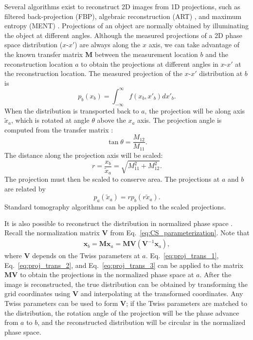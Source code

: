 Several algorithms exist to reconstruct 2D images from 1D projections, such as filtered back-projection (FBP), algebraic reconstruction (ART) \cite{Slaney1988}, and maximum entropy (MENT) \cite{Minerbo1979}. Projections of an object are normally obtained by illuminating the object at different angles. Although the measured projections of a 2D phase space distribution ($x$-$x'$) are always along the $x$ axis, we can take advantage of the known transfer matrix $\mathbf{M}$ between the measurement location $b$ and the reconstruction location $a$ to obtain the projections at different angles in $x$-$x'$ at the reconstruction location. The measured projection of the $x$-$x'$ distribution at $b$ is
%
\begin{equation}
    p_b(x_b) = \int_{-\infty}^{\infty} f(x_b, x'_b) dx'_b.
\end{equation}
%
When the distribution is transported back to $a$, the projection will be along axis $\tilde{x}_a$, which is rotated at angle $\theta$ above the $x_a$ axis. The projection angle is computed from the transfer matrix \cite{Hock2013a}:
%
\begin{equation}\label{eq:proj_trans_1}
    \tan\theta = \frac{M_{12}}{M_{11}}.
\end{equation}
%
The distance along the projection axis will be scaled:
%
\begin{equation}\label{eq:proj_trans_2}
    r = \frac{x_b}{\tilde{x}_a} = \sqrt{M_{11}^2 + M_{12}^2}.
\end{equation}
%
The projection must then be scaled to conserve area. The projections at $a$ and $b$ are related by 
%
\begin{equation}\label{eq:proj_trans_3}
    p_a(\tilde{x}_a) = r p_b(r \tilde{x}_a).
\end{equation}
%
Standard tomography algorithms can be applied to the scaled projections.

It is also possible to reconstruct the distribution in normalized phase space \cite{Hock2011}. Recall the normalization matrix $\mathbf{V}$ from Eq.~\eqref{eq:CS_parameterization}. Note that
%
\begin{equation}
\begin{aligned}
    \mathbf{x}_b 
    = \mathbf{M} \mathbf{x}_a
    = \mathbf{M} \mathbf{V} (\mathbf{V}^{-1} \mathbf{x}_a)
    ,
\end{aligned}
\end{equation}
%
where $\mathbf{V}$ depends on the Twiss parameters at $a$. Eq.~\eqref{eq:proj_trans_1}, Eq.~\eqref{eq:proj_trans_2}, and Eq.~\eqref{eq:proj_trans_3} can be applied to the matrix $\mathbf{M} \mathbf{V}$ to obtain the projections in the normalized phase space at $a$. After the image is reconstructed, the true distribution can be obtained by transforming the grid coordinates using $\mathbf{V}$ and interpolating at the transformed coordinates. Any Twiss parameters can be used to form $\mathbf{V}$; if the Twiss parameters are matched to the distribution, the rotation angle of the projection will be the phase advance from $a$ to $b$, and the reconstructed distribution will be circular in the normalized phase space. 


